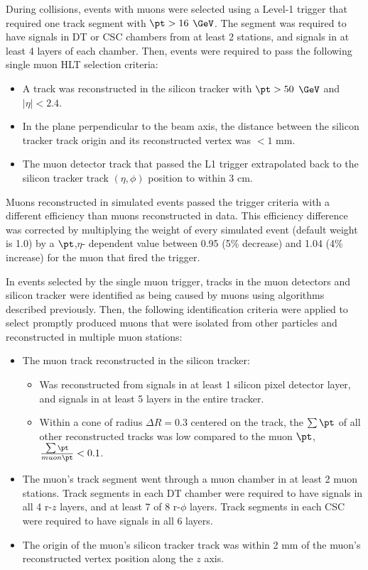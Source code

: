 During collisions, events with muons were selected using a Level-1 trigger that required one track segment with $\pt > 16$ $\GeV$.  The 
segment was required to have signals in DT or CSC chambers from at least 2 stations, and signals in at least 4 layers of each chamber.  
Then, events were required to pass the following single muon HLT selection criteria:

\begin{itemize}
	\item A track was reconstructed in the silicon tracker with $\pt > 50$ $\GeV$ and $|\eta| < 2.4$.
	\item In the plane perpendicular to the beam axis, the distance between the silicon tracker track origin and its 
		reconstructed vertex was $< 1$ mm.
	\item The muon detector track that passed the L1 trigger extrapolated back to the silicon tracker track $(\eta,\phi)$ 
		position to within 3 cm.
\end{itemize}

Muons reconstructed in simulated events passed the trigger criteria with a different efficiency than muons reconstructed in data.  This 
efficiency difference was corrected by multiplying the weight of every simulated event (default weight is 1.0) by a $\pt$,$\eta$-
dependent value between 0.95 (5\% decrease) and 1.04 (4\% increase) for the muon that fired the trigger.

In events selected by the single muon trigger, tracks in the muon detectors and silicon tracker were identified as being caused by muons 
using algorithms described previously.  Then, the following identification criteria were applied to select promptly produced muons 
that were isolated from other particles and reconstructed in multiple muon stations:

\begin{itemize}
	\item The muon track reconstructed in the silicon tracker:
	\begin{itemize}
		\item Was reconstructed from signals in at least 1 silicon pixel detector layer, and signals in at least 
			5 layers in the entire tracker.
		\item Within a cone of radius $\Delta R = 0.3$ centered on the track, the $\sum \pt$ of all other 
			reconstructed tracks was low compared to the muon $\pt$, $\frac{\sum \pt}{muon \pt} < 0.1$.
	\end{itemize}
	\item The muon's track segment went through a muon chamber in at least 2 muon stations.  Track segments in each DT 
		chamber were required to have signals in all 4 r-$z$ layers, and at least 7 of 8 r-$\phi$ layers.  Track segments 
		in each CSC were required to have signals in all 6 layers.
	\item The origin of the muon's silicon tracker track was within 2 mm of the muon's reconstructed vertex 
		position along the $z$ axis.
\end{itemize}

